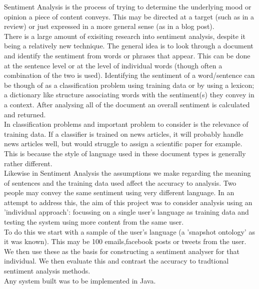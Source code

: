\documentclass[a4paper,11pt]{report}
\begin{document}
Sentiment Analysis is the process of trying to determine the underlying mood or opinion a piece of content conveys. This may be directed at a target (such as in a review) or just expressed in a more general sense (as in a blog post).\\
There is a large amount of exisiting research into sentiment analysis, despite it being a relatively new technique. The general idea is to look through a document and identify the sentiment from words or phrases that appear. This can be done at the sentence level or at the level of individual words (though often a combination of the two is used). Identifying the sentiment of a word/sentence can be though of as a classification problem using training data or by using a lexicon; a dictionary like structure associating words with the sentiment(s) they convey in a context.  After analysing all of the document an overall sentiment is calculated and returned.\\
In classification problems and important problem to consider is the relevance of training data. If a classifier is trained on news articles, it will probably handle news articles well, but would struggle to assign a scientific paper for example. This is because the style of language used in these document types is generally rather different.\\
Likewise in Sentiment Analysis the assumptions we make regarding the meaning of sentences and the training data used affect the accuracy to analysis. Two people may convey the same sentiment using very different language. In an attempt to address this, the aim of this project was to consider analysis using an 'individual approach': focussing on a single user's language as training data and testing the system using more content from the same user.\\
To do this we start with a sample of the user's language (a 'snapshot ontology' as it was known). This may be 100 emails,facebook posts or tweets from the user. We then use these as the basis for constructing a sentiment analyser for that individual. We then evaluate this and contrast the accuracy to tradtional sentiment analysis methods. \\
Any system built was to be implemented in Java.
\end{document}
